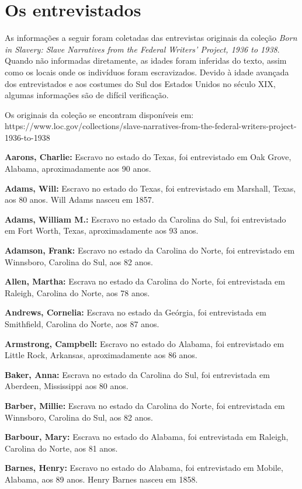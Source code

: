 \chapter{Os entrevistados}

As informações a seguir foram coletadas das entrevistas originais da
coleção \emph{Born in Slavery: Slave Narratives from the Federal
Writers' Project, 1936 to 1938}. Quando não informadas diretamente, as
idades foram inferidas do texto, assim como os locais onde os indivíduos
foram escravizados. Devido à idade avançada dos entrevistados e aos
costumes do Sul dos Estados Unidos no século XIX, algumas informações
são de difícil verificação.

Os originais da coleção se encontram disponíveis em:
https://www.loc.gov/collections/slave-narratives-from-the-federal-writers-project-1936-to-1938

\textbf{Aarons, Charlie:} Escravo no estado do Texas, foi entrevistado
em Oak Grove, Alabama, aproximadamente aos 90 anos.

\textbf{Adams, Will:} Escravo no estado do Texas, foi entrevistado em
Marshall, Texas, aos 80 anos. Will Adams nasceu em 1857.

\textbf{Adams, William M.:} Escravo no estado da Carolina do Sul, foi
entrevistado em Fort Worth, Texas, aproximadamente aos 93 anos.

\textbf{Adamson, Frank:} Escravo no estado da Carolina do Norte, foi
entrevistado em Winnsboro, Carolina do Sul, aos 82 anos.

\textbf{Allen, Martha:} Escrava no estado da Carolina do Norte, foi
entrevistada em Raleigh, Carolina do Norte, aos 78 anos.

\textbf{Andrews, Cornelia:} Escrava no estado da Geórgia, foi
entrevistada em Smithfield, Carolina do Norte, aos 87 anos.

\textbf{Armstrong, Campbell:} Escravo no estado do Alabama, foi
entrevistado em Little Rock, Arkansas, aproximadamente aos 86 anos.

\textbf{Baker, Anna:} Escrava no estado da Carolina do Sul, foi
entrevistada em Aberdeen, Mississippi aos 80 anos.

\textbf{Barber, Millie:} Escrava no estado da Carolina do Norte, foi
entrevistada em Winnsboro, Carolina do Sul, aos 82 anos.

\textbf{Barbour, Mary:} Escrava no estado do Alabama, foi entrevistada
em Raleigh, Carolina do Norte, aos 81 anos.

\textbf{Barnes, Henry:} Escravo no estado do Alabama, foi entrevistado
em Mobile, Alabama, aos 89 anos. Henry Barnes nasceu em 1858.

